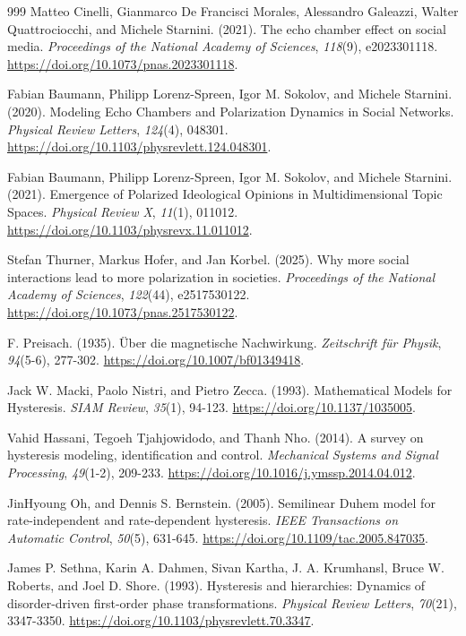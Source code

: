 \documentclass[10pt,a4paper]{article}
\begin{document}
\begin{thebibliography}{999}
Matteo Cinelli, Gianmarco De Francisci Morales, Alessandro Galeazzi, Walter Quattrociocchi, and Michele Starnini. (2021). The echo chamber effect on social media. \textit{Proceedings of the National Academy of Sciences}, \textit{118}(9), e2023301118. \url{https://doi.org/10.1073/pnas.2023301118}.

Fabian Baumann, Philipp Lorenz-Spreen, Igor M. Sokolov, and Michele Starnini. (2020). Modeling Echo Chambers and Polarization Dynamics in Social Networks. \textit{Physical Review Letters}, \textit{124}(4), 048301. \url{https://doi.org/10.1103/physrevlett.124.048301}.

Fabian Baumann, Philipp Lorenz-Spreen, Igor M. Sokolov, and Michele Starnini. (2021). Emergence of Polarized Ideological Opinions in Multidimensional Topic Spaces. \textit{Physical Review X}, \textit{11}(1), 011012. \url{https://doi.org/10.1103/physrevx.11.011012}.

Stefan Thurner, Markus Hofer, and Jan Korbel. (2025). Why more social interactions lead to more polarization in societies. \textit{Proceedings of the National Academy of Sciences}, \textit{122}(44), e2517530122. \url{https://doi.org/10.1073/pnas.2517530122}.

F. Preisach. (1935). \"{U}ber die magnetische Nachwirkung. \textit{Zeitschrift f\"{u}r Physik}, \textit{94}(5-6), 277-302. \url{https://doi.org/10.1007/bf01349418}.

Jack W. Macki, Paolo Nistri, and Pietro Zecca. (1993). Mathematical Models for Hysteresis. \textit{SIAM Review}, \textit{35}(1), 94-123. \url{https://doi.org/10.1137/1035005}.

Vahid Hassani, Tegoeh Tjahjowidodo, and Thanh Nho. (2014). A survey on hysteresis modeling, identification and control. \textit{Mechanical Systems and Signal Processing}, \textit{49}(1-2), 209-233. \url{https://doi.org/10.1016/j.ymssp.2014.04.012}.

JinHyoung Oh, and Dennis S. Bernstein. (2005). Semilinear Duhem model for rate-independent and rate-dependent hysteresis. \textit{IEEE Transactions on Automatic Control}, \textit{50}(5), 631-645. \url{https://doi.org/10.1109/tac.2005.847035}.

James P. Sethna, Karin A. Dahmen, Sivan Kartha, J. A. Krumhansl, Bruce W. Roberts, and Joel D. Shore. (1993). Hysteresis and hierarchies: Dynamics of disorder-driven first-order phase transformations. \textit{Physical Review Letters}, \textit{70}(21), 3347-3350. \url{https://doi.org/10.1103/physrevlett.70.3347}.


\end{thebibliography}
\end{document}
